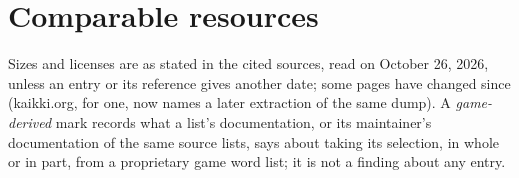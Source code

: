 \documentclass[11pt]{article}
\begin{document}
\section{Comparable resources}
\label{app:resources}

Sizes and licenses are as stated in the cited sources, read on October 26, 2026, unless an entry or its
reference gives another date; some pages have changed since (kaikki.org, for one, now names a later extraction of the
same dump). A \emph{game-derived} mark records what a list's documentation, or its maintainer's documentation of the
same source lists, says about taking its selection, in whole or in part, from a proprietary game word list;
it is not a finding about any entry.


\end{document}
